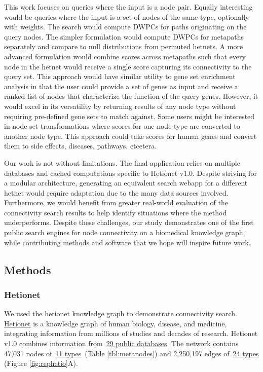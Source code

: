 This work focuses on queries where the input is a node pair.
Equally interesting would be queries where the input is a set of nodes of the same type, optionally with weights.
The search would compute DWPCs for paths originating on the query nodes.
The simpler formulation would compute DWPCs for metapaths separately and compare to null distributions from permuted hetnets.
A more advanced formulation would combine scores across metapaths such that every node in the hetnet would receive a single score capturing its connectivity to the query set.
This approach would have similar utility to gene set enrichment analysis in that the user could provide a set of genes as input and receive a ranked list of nodes that characterize the function of the query genes.
However, it would excel in its versatility by returning results of any node type without requiring pre-defined gene sets to match against.
Some users might be interested in node set transformations where scores for one node type are converted to another node type.
This approach could take scores for human genes and convert them to side effects, diseases, pathways, etcetera.

Our work is not without limitations.
The final application relies on multiple databases and cached computations specific to Hetionet v1.0.
Despite striving for a modular architecture,
generating an equivalent search webapp for a different hetnet would require adaptation due to the many data sources involved.
Furthermore, we would benefit from greater real-world evaluation of the connectivity search results to help identify situations where the method underperforms.
Despite these challenges, our study demonstrates one of the first public search engines for node connectivity on a biomedical knowledge graph, while contributing methods and software that we hope will inspire future work.

\hypertarget{methods}{%
\subsection{Methods}\label{methods}}

\hypertarget{hetionet}{%
\subsubsection{Hetionet}\label{hetionet}}

We used the hetionet knowledge graph to demonstrate connectivity search.
\href{https://het.io/about/}{Hetionet} is a knowledge graph of human biology, disease, and medicine,
integrating information from millions of studies and decades of research.
Hetionet v1.0 combines information from~\href{https://git.dhimmel.com/rephetio-manuscript/\#tbl:resources}{29 public databases}.
The network contains 47,031 nodes of~\href{https://git.dhimmel.com/rephetio-manuscript/\#tbl:metanodes}{11 types}~(Table \ref{tbl:metanodes}) and 2,250,197 edges of~\href{https://git.dhimmel.com/rephetio-manuscript/\#tbl:metaedges}{24 types} (Figure \ref{fig:rephetio}A).

